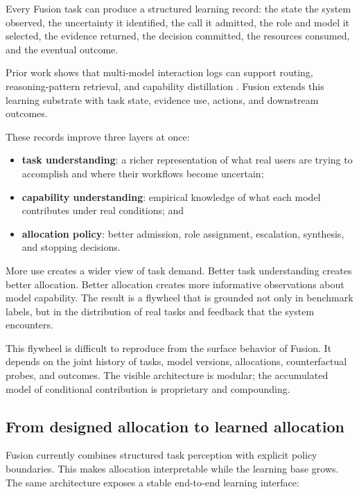 Every Fusion task can produce a structured learning record: the state the
system observed, the uncertainty it identified, the call it admitted, the role
and model it selected, the evidence returned, the decision committed, the
resources consumed, and the eventual outcome.

Prior work shows that multi-model interaction logs can support routing,
reasoning-pattern retrieval, and capability distillation
\citep{feng2026fusionfactory}. Fusion extends this learning substrate with
task state, evidence use, actions, and downstream outcomes.

These records improve three layers at once:

\begin{itemize}
  \item \textbf{task understanding}: a richer representation of what real users
  are trying to accomplish and where their workflows become uncertain;
  \item \textbf{capability understanding}: empirical knowledge of what each
  model contributes under real conditions; and
  \item \textbf{allocation policy}: better admission, role assignment,
  escalation, synthesis, and stopping decisions.
\end{itemize}

More use creates a wider view of task demand. Better task understanding creates
better allocation. Better allocation creates more informative observations
about model capability. The result is a flywheel that is grounded not only in
benchmark labels, but in the distribution of real tasks and feedback that the
system encounters.

This flywheel is difficult to reproduce from the surface behavior of Fusion.
It depends on the joint history of tasks, model versions, allocations,
counterfactual probes, and outcomes. The visible architecture is modular; the
accumulated model of conditional contribution is proprietary and compounding.

\subsection{From designed allocation to learned allocation}

Fusion currently combines structured task perception with explicit policy
boundaries. This makes allocation interpretable while the learning base grows.
The same architecture exposes a stable end-to-end learning interface:

